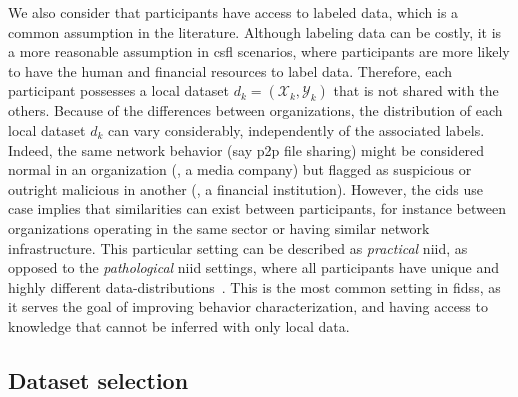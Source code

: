 We also consider that participants have access to labeled data, which is a common assumption in the literature.
Although labeling data can be costly, it is a more reasonable assumption in \gls{csfl} scenarios, where participants are more likely to have the human and financial resources to label data.
Therefore, each participant possesses a local dataset $d_k = (\mathcal{X}_k, \mathcal{Y}_k)$ that is not shared with the others.
Because of the differences between organizations, the distribution of each local dataset $d_k$ can vary considerably, independently of the associated labels.
Indeed, the same network behavior (say \gls{p2p} file sharing) might be considered normal in an organization (\eg, a media company) but flagged as suspicious or outright malicious in another (\eg, a financial institution).
However, the \gls{cids} use case implies that similarities can exist between participants, for instance between organizations operating in the same sector or having similar network infrastructure.
This particular setting can be described as \emph{practical} \gls{niid}, as opposed to the \emph{pathological} \gls{niid} settings, where all participants have unique and highly different data-distributions~\cite{huang_PersonalizedCrossSiloFederated_2021}.
This is the most common setting in \glspl{fids}, as it serves the goal of improving behavior characterization, and having access to knowledge that cannot be inferred with only local data.


\subsection{Dataset selection\label{sec:app.overview.dataset}}

